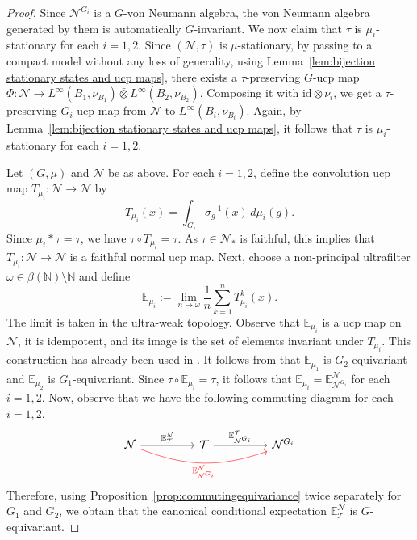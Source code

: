 \documentclass[12pt]{amsart}
\newcommand{\cN}{{\mathcal N}}
\theoremstyle{definition}
\begin{document}
\begin{proof}
Since $\mathcal{N}^{G_i}$ is a $G$-von Neumann algebra, the von Neumann algebra generated by them is automatically $G$-invariant. We now claim that $\tau$ is $\mu_i$-stationary for each $i=1,2$. Since $(\cN,\tau)$ is $\mu$-stationary, by passing to a compact model without any loss of generality, using Lemma~\ref{lem:bijection stationary states and ucp maps}, there exists a $\tau$-preserving $G$-ucp map $\Phi: \cN \to L^\infty(B_1,\nu_{B_1}) \bar{\otimes} L^\infty(B_2,\nu_{B_2})$. Composing it with $\text{id} \otimes \nu_i$,  we get a $\tau$- preserving $G_i$-ucp map from $\mathcal{N}$ to $L^\infty(B_i,\nu_{B_i})$. Again, by Lemma~\ref{lem:bijection stationary states and ucp maps}, it follows that $\tau$ is $\mu_i$-stationary for each $i=1,2$.


Let $(G,\mu)$ and $\cN$ be as above. For each $i=1,2$, define the convolution ucp map $T_{\mu_i}: \cN\to \cN$ by
\[
T_{\mu_i}(x)
= \int_{G_i} \sigma_{g}^{-1}(x)\, d\mu_i(g).
\]
Since $\mu_i * \tau = \tau$, we have $\tau \circ T_{\mu_i} = \tau$. 
As $\tau \in \cN_*$ is faithful, this implies that $T_{\mu_i}:\cN\to \cN$ is
a faithful normal ucp map. Next, choose a non-principal ultrafilter
$\omega \in \beta(\mathbb N)\setminus \mathbb N$ and define
\[
\mathbb{E}_{\mu_i}:= 
\lim_{n\to \omega} \frac{1}{n} \sum_{k=1}^n T_{\mu_i}^k(x).
\]
The limit is taken in the ultra-weak topology. Observe that $\mathbb{E}_{\mu_i}$ 
is a ucp map on $\cN$, it is idempotent, and its image is the set of 
elements invariant under $T_{\mu_i}$. This construction has already been used in \cite[Proposition~2.7]{bader2022charmenability}. It follows from \cite[Lemma~2.8]{bader2022charmenability} that $\mathbb{E}_{\mu_1}$ is $G_2$-equivariant and $\mathbb{E}_{\mu_2}$ is $G_1$-equivariant. Since $\tau\circ\mathbb{E}_{\mu_i}=\tau$, it follows that $\mathbb{E}_{\mu_i}=\mathbb{E}_{\cN^{G_i}}^{\cN}$ for each $i=1,2$. Now, observe that we have the following commuting diagram for each $i=1,2$.
\[
\begin{tikzcd}[column sep=huge] %
\mathcal{N} 
  \arrow[r, "\;\mathbb{E}_{\mathcal{T}}^{\cN}\;"] 
  \arrow[rr, bend right=20, red, swap, "\;\mathbb{E}_{\mathcal{N}^{G_i}}^{\mathcal{N}}\;"] 
& \mathcal{T} 
  \arrow[r, "\;\mathbb{E}_{\mathcal{N}^{G_i}}^{\mathcal{T}}\;"] 
& \mathcal{N}^{G_i}
\end{tikzcd}
\]
Therefore, using Proposition~\ref{prop:commutingequivariance} twice separately for $G_1$ and $G_2$, we obtain that the canonical conditional expectation  $\mathbb{E}_{\mathcal{T}}^{\cN}$ is $G$-equivariant.   
\end{proof}
\end{document}
